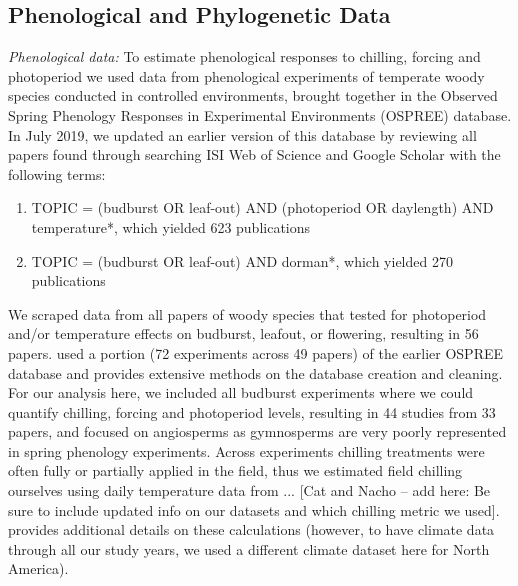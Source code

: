 \documentclass[11pt]{article}
\begin{document}
\subsection*{Phenological and Phylogenetic Data}
\emph{Phenological data:} To estimate phenological responses to chilling, forcing and photoperiod we used data from phenological experiments of temperate woody species conducted in controlled environments, brought together in the Observed Spring Phenology Responses in Experimental Environments (OSPREE) database. In July 2019, we updated an earlier version of this database \citep{wolkovich2019} by reviewing all papers found through searching ISI Web of Science and Google Scholar with the following terms: 
\begin{enumerate}
\item TOPIC = (budburst OR leaf-out) AND (photoperiod OR daylength) AND temperature*, which yielded 623 publications
\item TOPIC = (budburst OR leaf-out) AND dorman*, which yielded 270 publications
\end{enumerate}
We scraped data from all papers of woody species that tested for photoperiod and/or temperature effects on budburst, leafout, or flowering, resulting in 56 papers. \citet{ospreebbms} used a portion (72 experiments across 49 papers) of the earlier OSPREE database and provides extensive methods on the database creation and cleaning. For our analysis here, we included all budburst experiments where we could quantify chilling, forcing and photoperiod levels, resulting in 44 studies from 33 papers, and focused on angiosperms as gymnosperms are very poorly represented in spring phenology experiments. 
Across experiments chilling treatments were often fully or partially applied in the field, thus we estimated field chilling ourselves using daily temperature data from ... [Cat and Nacho -- add here: Be sure to include updated info on our datasets and which chilling metric we used]. \citet{ospreebbms} provides additional details on these calculations (however, to have climate data through all our study years, we used a different climate dataset here for North America).\\ 
\end{document}
